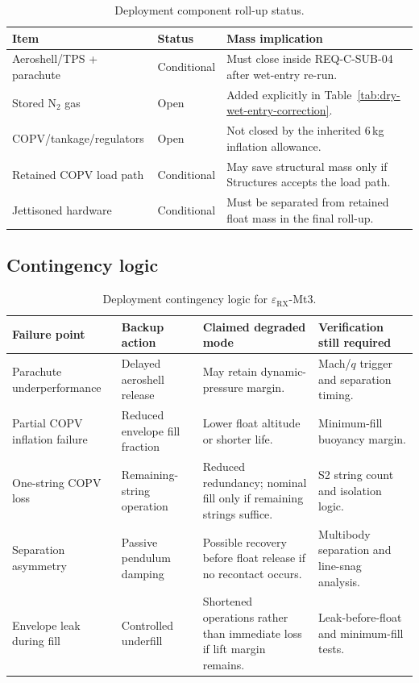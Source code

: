 \begin{table}[H]
\centering
\caption{Deployment component roll-up status.}
\label{tab:deployment-component-rollup}
\small
\renewcommand{\arraystretch}{1.10}
\begin{tabularx}{\textwidth}{@{}p{} p{} X@{}}
\toprule
\textbf{Item} & \textbf{Status} & \textbf{Mass implication} \\
\midrule
Aeroshell/TPS + parachute & Conditional & Must close inside REQ-C-SUB-04 after wet-entry re-run. \\
Stored N$_2$ gas & Open & Added explicitly in Table~\ref{tab:dry-wet-entry-correction}. \\
COPV/tankage/regulators & Open & Not closed by the inherited 6\,kg inflation allowance. \\
Retained COPV load path & Conditional & May save structural mass only if Structures accepts the load path. \\
Jettisoned hardware & Conditional & Must be separated from retained float mass in the final roll-up. \\
\bottomrule
\end{tabularx}
\end{table}

\subsection{Contingency logic}
\label{sec:8-4-1}

\begin{table}[H]
\centering
\small
\renewcommand{\arraystretch}{1}
\caption{Deployment contingency logic for $\varepsilon_{\mathrm{RX}}$-Mt3.}
\label{tab:fallback_arch}
\begin{tabularx}{\textwidth}{p{} p{} X X}
\toprule
\textbf{Failure point} & \textbf{Backup action} & \textbf{Claimed degraded mode} & \textbf{Verification still required} \\
\midrule
Parachute underperformance & Delayed aeroshell release & May retain dynamic-pressure margin. & Mach/$q$ trigger and separation timing. \\
Partial COPV inflation failure & Reduced envelope fill fraction & Lower float altitude or shorter life. & Minimum-fill buoyancy margin. \\
One-string COPV loss & Remaining-string operation & Reduced redundancy; nominal fill only if remaining strings suffice. & S2 string count and isolation logic. \\
Separation asymmetry & Passive pendulum damping & Possible recovery before float release if no recontact occurs. & Multibody separation and line-snag analysis. \\
Envelope leak during fill & Controlled underfill & Shortened operations rather than immediate loss if lift margin remains. & Leak-before-float and minimum-fill tests. \\
\bottomrule
\end{tabularx}
\end{table}


